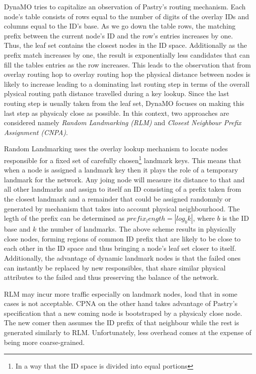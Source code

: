 \documentclass[a4paper,10pt]{article}
\begin{document}
DynaMO tries to capitalize an observation of Pastry's routing mechanism. Each node's table consists of rows equal to the number of digits of the overlay IDs and columns equal to the ID's base. As we go down the table rows, the matching prefix between the current node's ID and the row's entries increases by one. Thus, the leaf set contains the closest nodes in the ID space. Additionally as the prefix match increases by one, the result is exponentially less candidates that can fill the tables entries as the row increases. This leads to the observation \cite{antony_pastry_2001, castro_proximityp2p_2002} that from overlay routing hop to overlay routing hop the physical distance between nodes is likely to increase leading to a dominating last routing step in terms of the overall plysical routing path distance travelled during a key lookup. Since the last routing step is usually taken from the leaf set, DynaMO focuses on making this last step as physicaly close as possible. In this context, two approaches are considered namely \emph{Random Landmarking (RLM)} and \emph{Closest Neighbour Prefix Assignment (CNPA)}.

Random Landmarking uses the overlay lookup mechanism to locate nodes responsible for a fixed set of carefully chosen\footnote{In a way that the ID space is divided into equal portions} landmark keys. This means that when a node is assigned a landmark key then it plays the role of a temporary landmark for the network. Any joing node will measure its distance to that and all other landmarks and assign to itself an ID consisting of a prefix taken from the closest landmark and a remainder that could be assigned randomnly or generated by mechanism that takes into account physical neighbourhood. The legth of the prefix can be determined as $prefix_length=|log_b k|$, where $b$ is the ID base and $k$ the number of landmarks. The above scheme results in physically close nodes, forming regions of common ID prefix that are likely to be close to each other in the ID space and thus bringing a node's leaf set closer to itself. Additionally, the advantage of dynamic landmark nodes is that the failed ones can instantly be replaced by new responsibles, that share similar physical attributes to the failed and thus preserving the balance of the network.

RLM may incur more traffic especially on landmark nodes, load that in some cases is not acceptable. CPNA on the other hand takes advantage of Pastry's specification that a new coming node is bootstraped by a physicaly close node. The new comer then assumes the ID prefix of that neighbour while the rest is generated similarly to RLM. Unfortunately, less overhead comes at the expense of being more coarse-grained.
\end{document}
